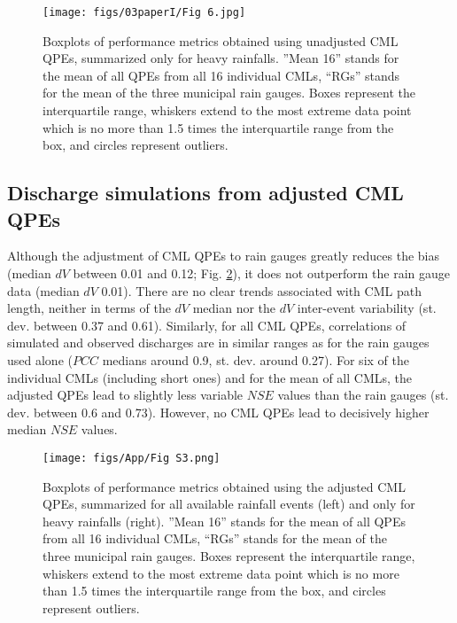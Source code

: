 \documentclass{ctuthesis}\usepackage[]{graphicx}\usepackage[]{color}
\begin{document}
\begin{figure}[h]
\begin{center}
\texttt{[image: figs/03paperI/Fig 6.jpg]}
\caption{Boxplots of performance metrics obtained using unadjusted CML QPEs, summarized only for heavy rainfalls. ”Mean 16” stands for the mean of all QPEs from all 16 individual CMLs, “RGs” stands for the mean of the three municipal rain gauges. Boxes represent the interquartile range, whiskers extend to the most extreme data point which is no more than 1.5 times the interquartile range from the box, and circles represent outliers.} \label{3fig6}
\end{center}
\end{figure}


\subsection{Discharge simulations from adjusted CML QPEs}

Although the adjustment of CML QPEs to rain gauges greatly reduces the bias (median $dV$ between 0.01 and 0.12; Fig. \ref{Fig:App_2}), it does not outperform the rain gauge data (median $dV$ 0.01). There are no clear trends associated with CML path length, neither in terms of the $dV$ median nor the $dV$ inter-event variability (st. dev. between 0.37 and 0.61). Similarly, for all CML QPEs, correlations of simulated and observed discharges are in similar ranges as for the rain gauges used alone ($PCC$ medians around 0.9, st. dev. around 0.27). For six of the individual CMLs (including short ones) and for the mean of all CMLs, the adjusted QPEs lead to slightly less variable $NSE$ values than the rain gauges (st. dev. between 0.6 and 0.73). However, no CML QPEs lead to decisively higher median $NSE$ values.

\begin{figure}[h]
\begin{center}
\texttt{[image: figs/App/Fig S3.png]}
\caption{Boxplots of performance metrics obtained using the adjusted CML QPEs, summarized for all available rainfall events (left) and only for heavy rainfalls (right). ”Mean 16” stands for the mean of all QPEs from all 16 individual CMLs, “RGs” stands for the mean of the three municipal rain gauges. Boxes represent the interquartile range, whiskers extend to the most extreme data point which is no more than 1.5 times the interquartile range from the box, and circles represent outliers.} 
\label{Fig:App_2}
\end{center}
\end{figure}
\end{document}

